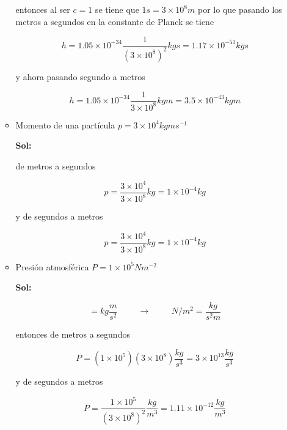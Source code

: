 \documentclass[12pt,a4paper]{article}
\begin{document}
\begin{enumerate}
\begin{itemize}
    entonces al ser $c=1$ se tiene que $1s = 3 \times 10^8 m$ por lo que pasando los metros a segundos en la constante de Planck se tiene
    
    \begin{equation*}
        h = 1.05 \times 10^{-34} \frac{1}{(3\times 10^8)^2} kg s= 1.17 \times 10^{-51} kg s
    \end{equation*}
    
    y ahora pasando segundo a metros
    
    \begin{equation*}
        h = 1.05 \times 10^{-34} \frac{1}{3\times 10^8} kg m= 3.5 \times 10^{-43} kg m
    \end{equation*}
    
    
    \item Momento de una partícula $p = 3 \times 10^4 kg m s^{-1}$
    
    \textbf{Sol:}
    
    de metros a segundos
    
    \begin{equation*}
        p = \frac{3 \times 10^4}{3\times 10^8} kg = 1\times 10^{-4} kg
    \end{equation*}
    
    y de segundos a metros
    
    \begin{equation*}
        p = \frac{3 \times 10^4}{3\times 10^8} kg = 1\times 10^{-4} kg
    \end{equation*}
    
    
    \item Presión atmosférica $P=1 \times 10^{5} N m^{-2}$
    
    \textbf{Sol:}
    
    \begin{equation*}
        [N] = kg \frac{m}{s^2} \hspace{1cm} \rightarrow \hspace{1cm} N/m^2 = \frac{kg}{s^2 m}
     \end{equation*}
     
     entonces de metros a segundos
     
     \begin{equation*}
         P = (1 \times 10^5) (3 \times 10^{8}) \frac{kg}{s^3} = 3 \times 10 ^{13} \frac{kg}{s^3}
     \end{equation*}
     
     
     y de segundos a metros
     
     \begin{equation*}
         P = \frac{1\times 10^{5}}{(3 \times 10 ^8)^2} \frac{kg}{m^3} = 1.11 \times 10^{-12  }\frac{kg}{m^3}
     \end{equation*}
    
\end{itemize}



    
    
\end{enumerate}
\end{document}
